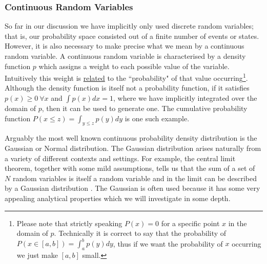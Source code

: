 \documentclass[../masters.tex]{subfiles}
\begin{document}
\subsubsection{Continuous Random Variables}

So far in our discussion we have implicitly only used discrete random variables; that is, our probability space consisted out of a finite number of events or states. However, it is also necessary to make precise what we mean by a continuous random variable. A continuous random variable is characterised by a density function $p$ which assigns a weight to each possible value of the variable. Intuitively this weight is \underline{related} to the ``probability" of that value occurring\footnote{Please note that strictly speaking $P(x)=0$ for a specific point $x$ in the domain of $p$. Technically it is correct to say that the probability of $P(x \in [a,b]) = \int_a^b p(y)dy$, thus if we want the probability of $x$ occurring we just make $[a,b]$ small.}. Although the density function is itself not a probability function, if it satisfies $p(x) \geq 0~\forall x$ and $\int p(x)dx = 1$, where we have implicitly integrated over the domain of $p$, then it can be used to generate one. The cumulative probability function $P(x \leq z)=\int_{y \leq z} p(y)dy$ is one such example. 

Arguably the most well known continuous probability density distribution is the Gaussian or Normal distribution. The Gaussian distribution arises naturally from a variety of different contexts and settings. For example, the central limit theorem, together with some mild assumptions, tells us that the sum of a set of $N$ random  variables is itself a random variable and in the limit can be described by a Gaussian distribution \cite{bishop}. The Gaussian is often used because it has some very appealing analytical properties which we will investigate in some depth. 
\end{document}
